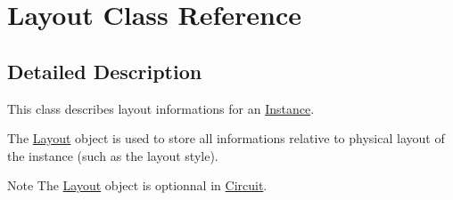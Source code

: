 \hypertarget{class_layout}{}\section{Layout Class Reference}
\label{class_layout}


\subsection{Detailed Description}
This class describes layout informations for an \mbox{\hyperlink{class_instance}{Instance}}.

The \mbox{\hyperlink{class_layout}{Layout}} object is used to store all informations relative to physical layout of the instance (such as the layout style).

\begin{DoxyNote}{Note}
The \mbox{\hyperlink{class_layout}{Layout}} object is optionnal in \mbox{\hyperlink{class_circuit}{Circuit}}. 
\end{DoxyNote}
